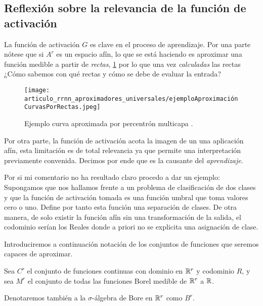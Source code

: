 \subsection{ Reflexión sobre la relevancia de la función de activación}  

La función de activación $G$ es clave en el proceso de aprendizaje.
Por una parte nótese que si $A^r$ es un espacio afín, lo que se está haciendo es 
aproximar una función medible a partir de \textit{rectas}, 
\ref{img:def_esenciales_ejemplo_curva_aproximada_percentrón_multicapa}
 por lo que una vez 
\textit{calculadas} las rectas ¿Cómo sabemos con qué rectas y cómo 
 se debe de evaluar la entrada? 
 
\begin{figure}[h!]
    \texttt{[image: articulo\_rrnn\_aproximadores\_universales/ejemploAproximaciónCurvasPorRectas.jpeg]}
    \caption{Ejemplo curva aproximada por percentrón multicapa \cite{alma991008058419704990}.}
    \label{img:def_esenciales_ejemplo_curva_aproximada_percentrón_multicapa}
\end{figure}

Por otra parte, la función de activación acota la imagen de un una aplicación afín, esta limitación 
es de total relevancia ya que permite una interpretación previamente convenida. 
Decimos por ende que es la causante del \textit{aprendizaje}.     

Por si mi comentario no ha resultado claro procedo a dar un ejemplo:   
Supongamos que nos hallamos frente a un problema de clasificación de dos clases y que la función de activación
tomada es una función umbral que toma valores cero o uno. Define por tanto esta función una separación de clases. 
De otra manera, de solo existir la función afín sin una transformación de la salida, el codominio serían los Reales
donde a priori no se explicita una asignación de clase.  

Introduciremos a continuación notación de los conjuntos de funciones que seremos capaces de aproximar.  

\begin{definicion}
    Sea $C^r$ el conjunto de funciones continuas con dominio en $\mathbb{R}^r$ y codominio $R$, 
    y sea $M^r$ el conjunto de todas las funciones Borel medible de $\mathbb{R}^r$ a $\mathbb{R}$. 

    Denotaremos también a la $\sigma$-álgebra de Bore en $\mathbb{R} ^r$ como $B^r$. 
\end{definicion}

